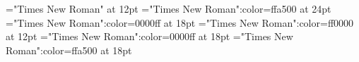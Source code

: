 \documentclass[a4paper]{article}
\begin{document}
 
\pagestyle{plain} 
\font\main="Times New Roman" at 12pt
\font\abcmain="Times New Roman":color=ffa500 at 24pt
\font\amain="Times New Roman":color=0000ff at 18pt
\font\bmain="Times New Roman":color=ff0000 at 12pt
\font\abenmain="Times New Roman":color=0000ff at 18pt
\font\acmain="Times New Roman":color=ffa500 at 18pt

\pagestyle{fancy} 






\end{document}
